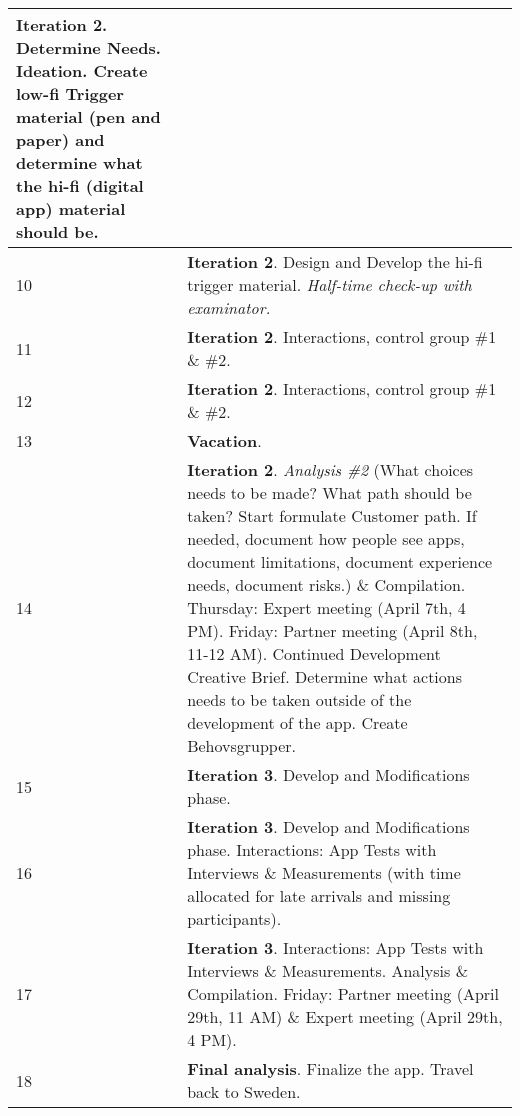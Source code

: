 \begin{center}
\begin{tabular}{ | l | p{10cm} |}
    \textbf{Iteration 2}. Determine Needs. Ideation. Create low-fi Trigger material (pen and paper) and determine what the hi-fi (digital app) material should be.
    \\ \hline
    10 & \textbf{Iteration 2}. Design and Develop the hi-fi trigger material. \textit{Half-time check-up with examinator.} \\ \hline
    11 & \textbf{Iteration 2}. Interactions, control group \#1 \& \#2. \\ \hline
    12 & \textbf{Iteration 2}. Interactions, control group \#1 \& \#2. %
    \\ \hline
    13 & \textbf{Vacation}. \\ \hline
    14 & \textbf{Iteration 2}. \textit{Analysis \#2} (What choices needs to be made? What path should be taken? Start formulate Customer path. If needed, document how people see apps, document limitations, document experience needs, document risks.) %
    \& Compilation. Thursday: Expert meeting (April 7th, 4 PM). Friday: Partner meeting (April 8th, 11-12 AM). Continued Development Creative Brief. Determine what actions needs to be taken outside of the development of the app. Create Behovsgrupper. \\ \hline

    15 & \textbf{Iteration 3}. Develop and Modifications phase. \\ \hline
    16 & \textbf{Iteration 3}. Develop and Modifications phase. Interactions: App Tests with Interviews \& Measurements (with time allocated for late arrivals and missing participants). \\ \hline
    17 & \textbf{Iteration 3}. Interactions: App Tests with Interviews \& Measurements.
    Analysis \& Compilation.
    Friday: Partner meeting (April 29th, 11 AM) \& Expert meeting (April 29th, 4 PM). \\ \hline
    18 & \textbf{Final analysis}. Finalize the app. Travel back to Sweden. \\ \hline
    \end{tabular}
\end{center}

